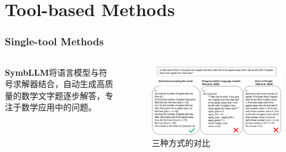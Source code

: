 \section{Tool-based Methods}
\begin{frame}
	\frametitle{Single-tool Methods}
	\begin{columns}
		\begin{column}{.2\textwidth}
			{\small \textbf{SymbLLM}将语言模型与符号求解器结合，自动生成高质量的数学文字题逐步解答，专注于数学应用中的问题。}
		\end{column}
		\begin{column}{.8\textwidth}
			\begin{figure}[h]
				\centering    \includegraphics[width=\columnwidth]{pic/declarative_vs_procedural.png}
				\caption{三种方式的对比}
				\label{fig:declarative_vs_procedural}
			\end{figure}
		\end{column}
	\end{columns}
\end{frame}

